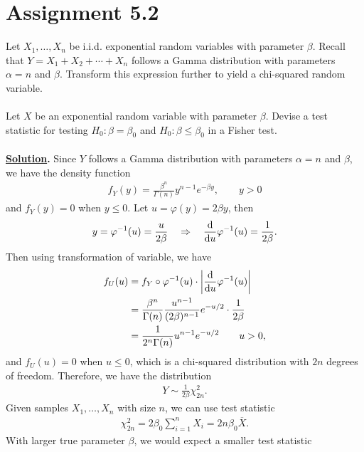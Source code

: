 \section*{Assignment 5.2}

Let $X_1, \ldots, X_n$ be i.i.d. exponential random variables with parameter $\beta$. Recall that $Y = X_1 + X_2 + \cdots + X_n$ follows a Gamma distribution with parameters $\alpha = n$ and $\beta$. Transform this expression further to yield a chi-squared random variable.\\
~\\
Let $X$ be an exponential random variable with parameter $\beta$. Devise a test statistic for testing $H_0: \beta = \beta_0$ and $H_0: \beta\leq \beta_0$ in a Fisher test. \\
~\\
\textbf{\underline{Solution}.} Since $Y$ follows a Gamma distribution with parameters $\alpha = n$ and $\beta$, we have the density function
\begin{align*}
f_Y(y) = \frac{\beta^{n}}{\Gamma(n)} y^{n-1}e^{-\beta y}, \qquad y > 0
\end{align*}
and $f_Y(y) = 0$ when $y \leq 0$. Let $u = \varphi(y) = 2\beta y$, then
\begin{align*}
y = \varphi^{-1}(u) = \frac{u}{2\beta}\quad\Rightarrow\quad \frac{\mathrm{d}}{\mathrm{d}u}\varphi^{-1}(u) = \frac{1}{2\beta}.
\end{align*}
Then using transformation of variable, we have
\begin{align*}
f_U(u) & = f_Y\circ \varphi^{-1}(u)\cdot \left|\frac{\mathrm{d}}{\mathrm{d}u}\varphi^{-1}(u) \right| \\
& = \frac{\beta^n}{\Gamma(n)} \frac{u^{n-1}}{(2\beta)^{n-1}} e^{-u/2}\cdot \frac{1}{2\beta} \\
& = \frac{1}{2^{n}\Gamma(n)} u^{n-1}e^{-u/2} \qquad u > 0,
\end{align*}
and $f_U(u) = 0$ when $u\leq 0$, which is a chi-squared distribution with $2n$ degrees of freedom. Therefore, we have the distribution
\begin{align*}
Y \sim \frac{1}{2\beta} \chi_{2n}^2.
\end{align*}
Given samples $X_1, \ldots, X_n$ with size $n$, we can use test statistic
\begin{align*}
\chi_{2n}^2 = 2\beta_0 \sum_{i=1}^n X_i = 2n\beta_0 \overline{X}.
\end{align*}
With larger true parameter $\beta$, we would expect a smaller test statistic
